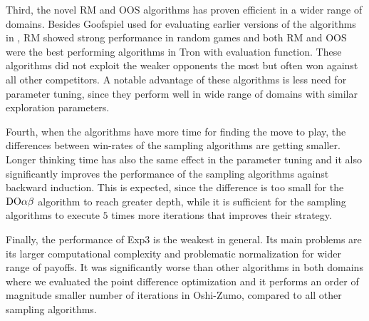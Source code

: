 Third, the novel RM and OOS algorithms has proven efficient in a wider range of domains. Besides Goofspiel used for evaluating earlier versions of the algorithms in \cite{Lanctot13Goofspiel}, RM showed strong performance in random games and both RM and OOS were the best performing algorithms in Tron with evaluation function. These algorithms did not exploit the weaker opponents the most but often won against all other competitors. A notable advantage of these algorithms is less need for parameter tuning, since they perform well in wide range of domains with similar exploration parameters.

Fourth, when the algorithms have more time for finding the move to play, the differences between win-rates of the sampling algorithms are getting smaller. Longer thinking time has also the same effect in the parameter tuning and it also significantly improves the performance of the sampling algorithms against backward induction. This is expected, since the difference is too small for the $\textrm{DO}\alpha\beta$ algorithm to reach greater depth, while it is sufficient for the sampling algorithms to execute $5$ times more iterations that improves their strategy.

Finally, the performance of Exp3 is the weakest in general. Its main problems are its larger computational complexity and problematic normalization for wider range of payoffs. It was significantly worse than other algorithms in both domains where we evaluated the point difference optimization and it performs an order of magnitude smaller number of iterations in Oshi-Zumo, compared to all other sampling algorithms.


